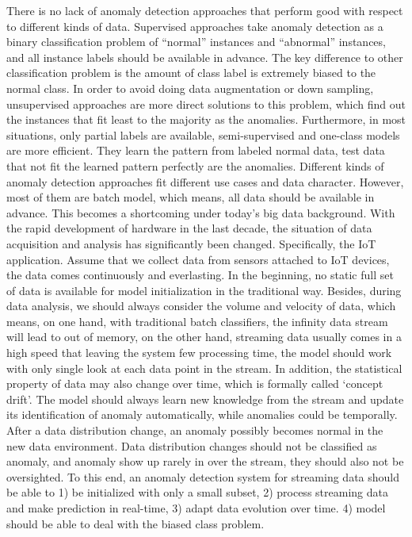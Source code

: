 There is no lack of anomaly detection approaches that perform good with respect to different kinds of data. Supervised approaches take anomaly detection as a binary classification problem of “normal” instances and “abnormal” instances, and all instance labels should be available in advance. The key difference to other classification problem is the amount of class label is extremely biased to the normal class. In order to avoid doing data augmentation or down sampling, unsupervised approaches are more direct solutions to this problem, which find out the instances that fit least to the majority as the anomalies. Furthermore, in most situations, only partial labels are available, semi-supervised and one-class models are more efficient. They learn the pattern from labeled normal data, test data that not fit the learned pattern perfectly are the anomalies. Different kinds of anomaly detection approaches fit different use cases and data character. However, most of them are batch model, which means, all data should be available in advance. This becomes a shortcoming under today’s big data background. With the rapid development of hardware in the last decade, the situation of data acquisition and analysis has significantly been changed. Specifically, the IoT application. Assume that we collect data from sensors attached to IoT devices, the data comes continuously and everlasting. In the beginning, no static full set of data is available for model initialization in the traditional way. Besides, during data analysis, we should always consider the volume and velocity of data, which means, on one hand, with traditional batch classifiers, the infinity data stream will lead to out of memory, on the other hand, streaming data usually comes in a high speed that leaving the system few processing time, the model should work with only single look at each data point in the stream. In addition, the statistical property of data may also change over time, which is formally called ‘concept drift’. The model should always learn new knowledge from the stream and update its identification of anomaly automatically, while anomalies could be temporally. After a data distribution change, an anomaly possibly becomes normal in the new data environment. Data distribution changes should not be classified as anomaly, and anomaly show up rarely in over the stream, they should also not be oversighted. To this end, an anomaly detection system for streaming data should be able to 1) be initialized with only a small subset, 2) process streaming data and make prediction in real-time, 3) adapt data evolution over time. 4) model should be able to deal with the biased class problem.\\


